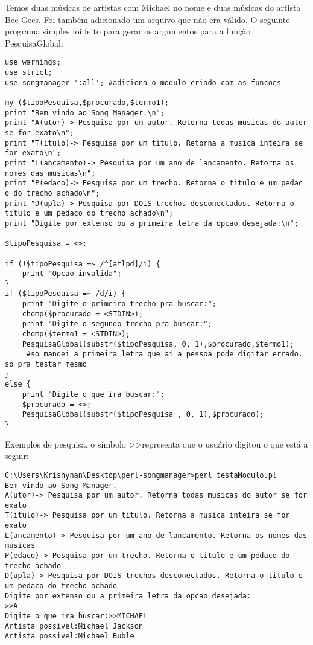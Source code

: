 \documentclass[12pt]{article}
\begin{document}
Temos duas músicas de artistas com Michael no nome e duas músicas do artista Bee Gees. Foi também adicionado um arquivo que não era válido. O seguinte programa simples foi feito para gerar os argumentos para a função PesquisaGlobal:
\begin{lstlisting}
use warnings;
use strict;
use songmanager ':all'; #adiciona o modulo criado com as funcoes

my ($tipoPesquisa,$procurado,$termo1);
print "Bem vindo ao Song Manager.\n";
print "A(utor)-> Pesquisa por um autor. Retorna todas musicas do autor se for exato\n";
print "T(itulo)-> Pesquisa por um titulo. Retorna a musica inteira se for exato\n";
print "L(ancamento)-> Pesquisa por um ano de lancamento. Retorna os nomes das musicas\n";
print "P(edaco)-> Pesquisa por um trecho. Retorna o titulo e um pedac
o do trecho achado\n";
print "D(upla)-> Pesquisa por DOIS trechos desconectados. Retorna o titulo e um pedaco do trecho achado\n";
print "Digite por extenso ou a primeira letra da opcao desejada:\n";

$tipoPesquisa = <>;

if (!$tipoPesquisa =~ /^[atlpd]/i) {
	print "Opcao invalida";
}
if ($tipoPesquisa =~ /d/i) {
	print "Digite o primeiro trecho pra buscar:";
	chomp($procurado = <STDIN>);
	print "Digite o segundo trecho pra buscar:";
	chomp($termo1 = <STDIN>);
	PesquisaGlobal(substr($tipoPesquisa, 0, 1),$procurado,$termo1);
     #so mandei a primeira letra que ai a pessoa pode digitar errado. so pra testar mesmo
}
else {
	print "Digite o que ira buscar:";
	$procurado = <>;
	PesquisaGlobal(substr($tipoPesquisa	, 0, 1),$procurado);
}
\end{lstlisting}
Exemplos de pesquisa, o símbolo \textgreater\textgreater\space representa que o usuário digitou o que está a seguir:
\begin{lstlisting}[language={}]
C:\Users\Krishynan\Desktop\perl-songmanager>perl testaModulo.pl
Bem vindo ao Song Manager.
A(utor)-> Pesquisa por um autor. Retorna todas musicas do autor se for exato
T(itulo)-> Pesquisa por um titulo. Retorna a musica inteira se for exato
L(ancamento)-> Pesquisa por um ano de lancamento. Retorna os nomes das musicas
P(edaco)-> Pesquisa por um trecho. Retorna o titulo e um pedaco do trecho achado
D(upla)-> Pesquisa por DOIS trechos desconectados. Retorna o titulo e um pedaco do trecho achado
Digite por extenso ou a primeira letra da opcao desejada:
>>A
Digite o que ira buscar:>>MICHAEL
Artista possivel:Michael Jackson
Artista possivel:Michael Buble
\end{lstlisting}
\end{document}
